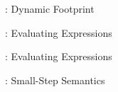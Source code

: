 
\begin{figure}
    
    \caption{\svl: Dynamic Footprint}
\end{figure}

\begin{figure}
    
    \caption{\svl: Evaluating Expressions}
\end{figure}

\begin{figure}
    \boxed{\evalphi \phi}
    
    \caption{\svl: Evaluating Expressions}
\end{figure}

\begin{figure}
    
    \caption{\svl: Small-Step Semantics}
\end{figure}